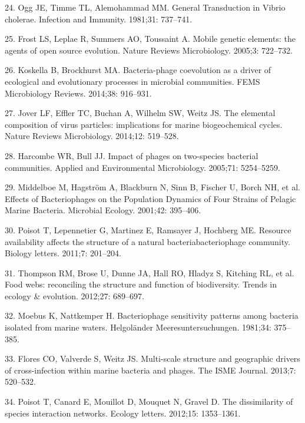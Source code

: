 \documentclass[12pt,]{article}
\begin{document}
\hypertarget{ref-Ogg:1981th}{}
24. Ogg JE, Timme TL, Alemohammad MM. General Transduction in Vibrio
cholerae. Infection and Immunity. 1981;31: 737--741.

\hypertarget{ref-Frost:2005dn}{}
25. Frost LS, Leplae R, Summers AO, Toussaint A. Mobile genetic
elements: the agents of open source evolution. Nature Reviews
Microbiology. 2005;3: 722--732.

\hypertarget{ref-Koskella:2014ds}{}
26. Koskella B, Brockhurst MA. Bacteria-phage coevolution as a driver of
ecological and evolutionary processes in microbial communities. FEMS
Microbiology Reviews. 2014;38: 916--931.

\hypertarget{ref-Jover:2014gq}{}
27. Jover LF, Effler TC, Buchan A, Wilhelm SW, Weitz JS. The elemental
composition of virus particles: implications for marine biogeochemical
cycles. Nature Reviews Microbiology. 2014;12: 519--528.

\hypertarget{ref-Harcombe:2005fd}{}
28. Harcombe WR, Bull JJ. Impact of phages on two-species bacterial
communities. Applied and Environmental Microbiology. 2005;71:
5254--5259.

\hypertarget{ref-Middelboe:2001fl}{}
29. Middelboe M, Hagström A, Blackburn N, Sinn B, Fischer U, Borch NH,
et al. Effects of Bacteriophages on the Population Dynamics of Four
Strains of Pelagic Marine Bacteria. Microbial Ecology. 2001;42:
395--406.

\hypertarget{ref-Poisot:2011jc}{}
30. Poisot T, Lepennetier G, Martinez E, Ramsayer J, Hochberg ME.
Resource availability affects the structure of a natural
bacteriabacteriophage community. Biology letters. 2011;7: 201--204.

\hypertarget{ref-Thompson:2012ki}{}
31. Thompson RM, Brose U, Dunne JA, Hall RO, Hladyz S, Kitching RL, et
al. Food webs: reconciling the structure and function of biodiversity.
Trends in ecology \& evolution. 2012;27: 689--697.

\hypertarget{ref-Moebus:1981kp}{}
32. Moebus K, Nattkemper H. Bacteriophage sensitivity patterns among
bacteria isolated from marine waters. Helgoländer Meeresuntersuchungen.
1981;34: 375--385.

\hypertarget{ref-Flores:2013hc}{}
33. Flores CO, Valverde S, Weitz JS. Multi-scale structure and
geographic drivers of cross-infection within marine bacteria and phages.
The ISME Journal. 2013;7: 520--532.

\hypertarget{ref-Poisot:2012fh}{}
34. Poisot T, Canard E, Mouillot D, Mouquet N, Gravel D. The
dissimilarity of species interaction networks. Ecology letters. 2012;15:
1353--1361.
\end{document}
